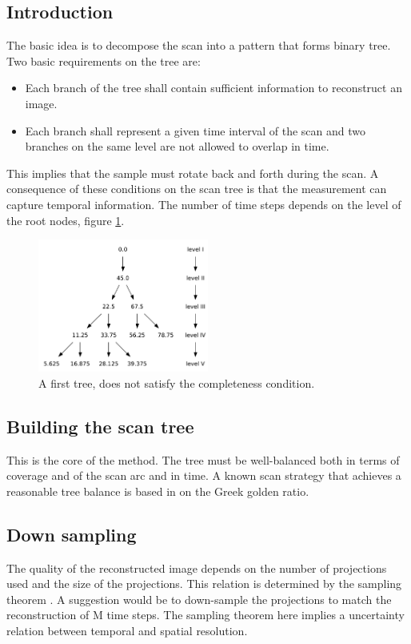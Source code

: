 \documentclass[a4paper,10pt]{scrartcl}
\begin{document}
\subsection{Introduction}
The basic idea is to decompose the scan into a pattern that forms binary tree. Two basic requirements on the tree are:
\begin{itemize}
 \item Each branch of the tree shall contain sufficient information to reconstruct an image.
 \item Each branch shall represent a given time interval of the scan and two branches on the same level are not allowed to overlap in time.
\end{itemize}
This implies that the sample must rotate back and forth during the scan. A consequence of these conditions on the scan tree is that the measurement can capture temporal information. The number of time steps depends on the level of the root nodes, figure \ref{fig_binarytree}.
\begin{figure}
 \centering
 \includegraphics[width=0.5\textwidth]{figures/tree}
 \caption{A first tree, does not satisfy the completeness condition.}\label{fig_binarytree}
\end{figure}

\subsection{Building the scan tree}\label{sec_ScanTree}
This is the core of the method. The tree must be well-balanced both in terms of coverage and of the scan arc and in time. A known scan strategy that achieves a reasonable tree balance is based in on the Greek golden ratio\cite{goldenratio}.  

\subsection{Down sampling}
The quality of the reconstructed image depends on the number of projections used and the size of the projections. This relation is determined by the sampling theorem \cite{kak88}. A suggestion would be to down-sample the projections to match the reconstruction of M time steps. The sampling theorem here implies a uncertainty relation between temporal and spatial resolution.
\end{document}
